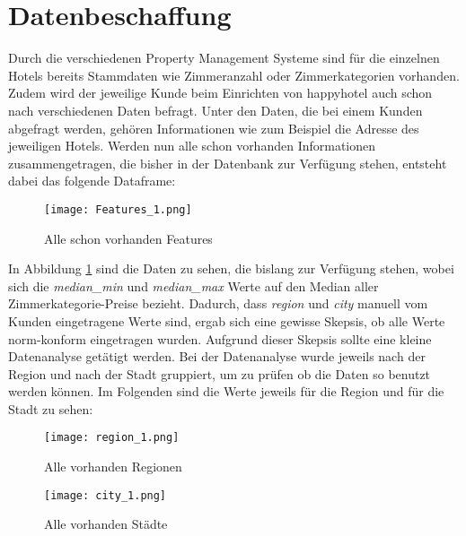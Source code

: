 \section{Datenbeschaffung}
\label{subsec:Datenbeschaffung}
Durch die verschiedenen Property Management Systeme sind für die einzelnen Hotels bereits Stammdaten wie Zimmeranzahl oder Zimmerkategorien vorhanden. Zudem wird der jeweilige Kunde beim Einrichten von happyhotel auch schon nach verschiedenen Daten befragt. Unter den Daten, die bei einem Kunden abgefragt werden, gehören Informationen wie zum Beispiel die Adresse des jeweiligen Hotels. 
\newline
\newline
Werden nun alle schon vorhanden Informationen zusammengetragen, die bisher in der Datenbank zur Verfügung stehen, entsteht dabei das folgende Dataframe:
\begin{figure}[h]
    \centering
    \texttt{[image: Features\_1.png]}
    \caption[Alle schon vorhanden Features]{Alle schon vorhanden Features}
    \label{img:all_Features}
\end{figure}

In Abbildung \ref{img:all_Features} sind die Daten zu sehen, die bislang zur Verfügung stehen, wobei sich die \emph{median\_min} und \emph{median\_max} Werte auf den Median aller Zimmerkategorie-Preise bezieht.
\newline
\newline
Dadurch, dass \emph{region} und \emph{city} manuell vom Kunden eingetragene Werte sind, ergab sich eine gewisse Skepsis, ob alle Werte norm-konform eingetragen wurden. Aufgrund dieser Skepsis sollte eine kleine Datenanalyse getätigt werden. 
\newline
\newline
Bei der Datenanalyse wurde jeweils nach der Region und nach der Stadt gruppiert, um zu prüfen ob die Daten so benutzt werden können. Im Folgenden sind die Werte jeweils für die Region und für die Stadt zu sehen:

\begin{figure}[h]
    \centering
    \texttt{[image: region\_1.png]}
    \caption[Alle vorhanden Regionen]{Alle vorhanden Regionen}
    \label{img:region_1}
\end{figure}

\begin{figure}[h]
    \centering
    \texttt{[image: city\_1.png]}
    \caption[Alle vorhanden Städte]{Alle vorhanden Städte}
    \label{img:city_1}
\end{figure}

